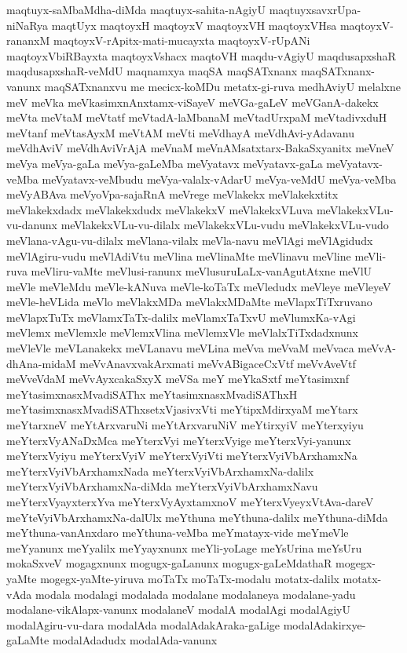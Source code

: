 {maqtuyx-saMbaMdha-diMda
maqtuyx-sahita-nAgiyU
maqtuyxsavxrUpa-niNaRya
maqtUyx
maqtoyxH
maqtoyxV
maqtoyxVH
maqtoyxVHsa
maqtoyxV-rananxM
maqtoyxV-rApitx-mati-mucayxta
maqtoyxV-rUpANi
maqtoyxVbiRBayxta
maqtoyxVshacx
maqtoVH
maqdu-vAgiyU
maqdusapxshaR
maqdusapxshaR-veMdU
maqnamxya
maqSA
maqSATxnanx
maqSATxnanx-vanunx
maqSATxnanxvu
me
mecicx-koMDu
metatx-gi-ruva
medhAviyU
melalxne
meV
meVka
meVkasimxnAnxtamx-viSayeV
meVGa-gaLeV
meVGanA-dakekx
meVta
meVtaM
meVtatf
meVtadA-laMbanaM
meVtadUrxpaM
meVtadivxduH
meVtanf
meVtasAyxM
meVtAM
meVti
meVdhayA
meVdhAvi-yAdavanu
meVdhAviV
meVdhAviVrAjA
meVnaM
meVnAMsatxtarx-BakaSxyanitx
meVneV
meVya
meVya-gaLa
meVya-gaLeMba
meVyatavx
meVyatavx-gaLa
meVyatavx-veMba
meVyatavx-veMbudu
meVya-valalx-vAdarU
meVya-veMdU
meVya-veMba
meVyABAva
meVyoVpa-sajaRnA
meVrege
meVlakekx
meVlakekxtitx
meVlakekxdadx
meVlakekxdudx
meVlakekxV
meVlakekxVLuva
meVlakekxVLu-vu-danunx
meVlakekxVLu-vu-dilalx
meVlakekxVLu-vudu
meVlakekxVLu-vudo
meVlana-vAgu-vu-dilalx
meVlana-vilalx
meVla-navu
meVlAgi
meVlAgidudx
meVlAgiru-vudu
meVlAdiVtu
meVlina
meVlinaMte
meVlinavu
meVline
meVli-ruva
meVliru-vaMte
meVlusi-ranunx
meVlusuruLaLx-vanAgutAtxne
meVlU
meVle
meVleMdu
meVle-kANuva
meVle-koTaTx
meVledudx
meVleye
meVleyeV
meVle-heVLida
meVlo
meVlakxMDa
meVlakxMDaMte
meVlapxTiTxruvano
meVlapxTuTx
meVlamxTaTx-dalilx
meVlamxTaTxvU
meVlumxKa-vAgi
meVlemx
meVlemxle
meVlemxVlina
meVlemxVle
meVlalxTiTxdadxnunx
meVleVle
meVLanakekx
meVLanavu
meVLina
meVva
meVvaM
meVvaca
meVvA-dhAna-midaM
meVvAnavxvakArxmati
meVvABigaceCxVtf
meVvAveVtf
meVveVdaM
meVvAyxcakaSxyX
meVSa
meY
meYkaSxtf
meYtasimxnf
meYtasimxnasxMvadiSAThx
meYtasimxnasxMvadiSAThxH
meYtasimxnasxMvadiSAThxsetxVjasivxVti
meYtipxMdirxyaM
meYtarx
meYtarxneV
meYtArxvaruNi
meYtArxvaruNiV
meYtirxyiV
meYterxyiyu
meYterxVyANaDxMca
meYterxVyi
meYterxVyige
meYterxVyi-yanunx
meYterxVyiyu
meYterxVyiV
meYterxVyiVti
meYterxVyiVbArxhamxNa
meYterxVyiVbArxhamxNada
meYterxVyiVbArxhamxNa-dalilx
meYterxVyiVbArxhamxNa-diMda
meYterxVyiVbArxhamxNavu
meYterxVyayxterxYva
meYterxVyAyxtamxnoV
meYterxVyeyxVtAva-dareV
meYteVyiVbArxhamxNa-dalUlx
meYthuna
meYthuna-dalilx
meYthuna-diMda
meYthuna-vanAnxdaro
meYthuna-veMba
meYmatayx-vide
meYmeVle
meYyanunx
meYyalilx
meYyayxnunx
meYli-yoLage
meYsUrina
meYsUru
mokaSxveV
mogagxnunx
mogugx-gaLanunx
mogugx-gaLeMdathaR
mogegx-yaMte
mogegx-yaMte-yiruva
moTaTx
moTaTx-modalu
motatx-dalilx
motatx-vAda
modala
modalagi
modalada
modalane
modalaneya
modalane-yadu
modalane-vikAlapx-vanunx
modalaneV
modalA
modalAgi
modalAgiyU
modalAgiru-vu-dara
modalAda
modalAdakAraka-gaLige
modalAdakirxye-gaLaMte
modalAdadudx
modalAda-vanunx
}
